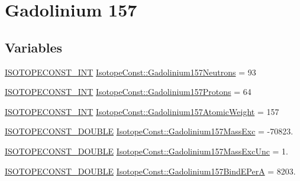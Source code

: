 \hypertarget{group___isotope_const-_gadolinium-_gd157}{}\section{Gadolinium 157}
\label{group___isotope_const-_gadolinium-_gd157}
\subsection*{Variables}
\begin{DoxyCompactItemize}
\item 
\mbox{\hyperlink{group___isotope_const-_macros_ga5f18360b3e99483a35c32d789e62621c}{I\+S\+O\+T\+O\+P\+E\+C\+O\+N\+S\+T\+\_\+\+I\+NT}} \mbox{\hyperlink{group___isotope_const-_gadolinium-_gd157_ga2506f92a71c303e27bf38d90ff847449}{Isotope\+Const\+::\+Gadolinium157\+Neutrons}} = 93
\item 
\mbox{\hyperlink{group___isotope_const-_macros_ga5f18360b3e99483a35c32d789e62621c}{I\+S\+O\+T\+O\+P\+E\+C\+O\+N\+S\+T\+\_\+\+I\+NT}} \mbox{\hyperlink{group___isotope_const-_gadolinium-_gd157_ga76d18e35a712dbc0ef69dfeab9833adb}{Isotope\+Const\+::\+Gadolinium157\+Protons}} = 64
\item 
\mbox{\hyperlink{group___isotope_const-_macros_ga5f18360b3e99483a35c32d789e62621c}{I\+S\+O\+T\+O\+P\+E\+C\+O\+N\+S\+T\+\_\+\+I\+NT}} \mbox{\hyperlink{group___isotope_const-_gadolinium-_gd157_gabe4098571772fc236805073327acd749}{Isotope\+Const\+::\+Gadolinium157\+Atomic\+Weight}} = 157
\item 
\mbox{\hyperlink{group___isotope_const-_macros_ga8f45a7272ce02c0b4c65c44636ed719a}{I\+S\+O\+T\+O\+P\+E\+C\+O\+N\+S\+T\+\_\+\+D\+O\+U\+B\+LE}} \mbox{\hyperlink{group___isotope_const-_gadolinium-_gd157_ga87b05cfdb14655f60bc69ea3b1b6b10a}{Isotope\+Const\+::\+Gadolinium157\+Mass\+Exc}} = -\/70823.
\item 
\mbox{\hyperlink{group___isotope_const-_macros_ga8f45a7272ce02c0b4c65c44636ed719a}{I\+S\+O\+T\+O\+P\+E\+C\+O\+N\+S\+T\+\_\+\+D\+O\+U\+B\+LE}} \mbox{\hyperlink{group___isotope_const-_gadolinium-_gd157_ga4bb14dfea2fad5613640b3c2a7602d01}{Isotope\+Const\+::\+Gadolinium157\+Mass\+Exc\+Unc}} = 1.
\item 
\mbox{\hyperlink{group___isotope_const-_macros_ga8f45a7272ce02c0b4c65c44636ed719a}{I\+S\+O\+T\+O\+P\+E\+C\+O\+N\+S\+T\+\_\+\+D\+O\+U\+B\+LE}} \mbox{\hyperlink{group___isotope_const-_gadolinium-_gd157_gaddb30bfa2b84475e883d9ef1fa5e12aa}{Isotope\+Const\+::\+Gadolinium157\+Bind\+E\+PerA}} = 8203.

\end{DoxyCompactItemize}
